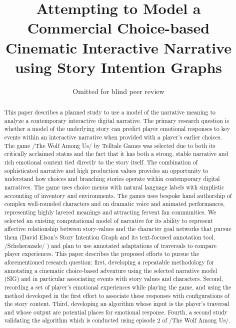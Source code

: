 \message{ !name(fdg_template.tex)}\documentclass[sigconf]{acmart}
\begin{document}

\title{Attempting to Model a Commercial Choice-based Cinematic Interactive Narrative using Story Intention Graphs}
\author{Omitted for blind peer review}
\email{}

\begin{abstract}
This paper describes a planned study to use a model of the narrative
meaning to analyze a contemporary interactive digital narrative. The
primary research question is whether a model of the underlying story
can predict player emotional responses to key events within an
interactive narrative when provided with a player's earlier
choices. The game /The Wolf Among Us/ by Telltale Games was selected
due to both its critically acclaimed status and the fact that it has
both a strong, stable narrative and rich emotional content tied
directly to the story itself. The combination of sophisticated
narrative and high production values provides an opportunity to
understand how choices and branching stories operate within
contemporary digital narratives. The game uses choice menus with
natural language labels with simplistic accounting of inventory and
environments. The games uses bespoke hand authorship of complex
well-rounded characters and on dramatic voice and animated
performances, representing highly layered meanings and attracting
fervent fan communities.  We selected an existing computational model
of narrative for its ability to represent affective relationship
between story-values and the character goal networks that pursue them
(David Elson's Story Intention Graph and its text-focused annotation
tool, /Scheherazade/ \cite{Elson2012}) and plan to use annotated
adaptations of traversals to compare player experiences. This paper
describes the proposed efforts to pursue the aforementioned research
question: first, developing a repeatable methodology for annotating a
cinematic choice-based adventure using the selected narrative model
(SIG) and in particular associating events with story values and
characters. Second, recording a set of player's emotional experiences
while playing the game, and using the method developed in the first
effort to associate these responses with configurations of the story
content. Third, developing an algorithm whose input is the player's
traversal and whose output are potential places for emotional
response. Fourth, a second study validating the algorithm which is
conducted using episode 2 of /The Wolf Among Us/.
\end{abstract}
\end{document}
